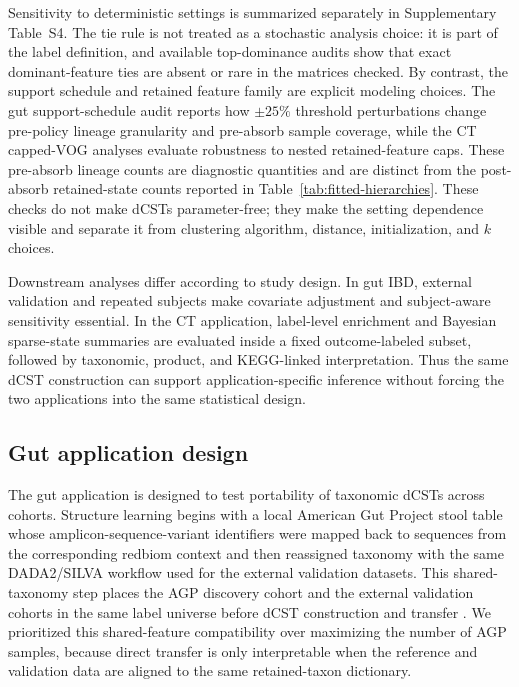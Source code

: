 \documentclass[11pt]{article}
\newcounter{algorithm}
\begin{document}
Sensitivity to deterministic settings is summarized separately in
Supplementary Table~S4. The tie rule is not treated as a stochastic analysis
choice: it is part of the label definition, and available top-dominance audits
show that exact dominant-feature ties are absent or rare in the matrices
checked. By contrast, the support schedule and retained feature family are
explicit modeling choices. The gut support-schedule audit reports how
\(\pm25\%\) threshold perturbations change pre-policy lineage granularity and
pre-absorb sample coverage, while the CT capped-VOG analyses evaluate robustness
to nested retained-feature caps. These pre-absorb lineage counts are diagnostic
quantities and are distinct from the post-absorb retained-state counts reported
in Table~\ref{tab:fitted-hierarchies}.
These checks do not make dCSTs parameter-free; they make the setting dependence
visible and separate it from clustering algorithm, distance, initialization, and
\(k\) choices.

Downstream analyses differ according to study design. In gut IBD, external
validation and repeated subjects make covariate adjustment and subject-aware
sensitivity essential. In the CT application, label-level enrichment and
Bayesian sparse-state summaries are evaluated inside a fixed outcome-labeled
subset, followed by taxonomic, product, and KEGG-linked interpretation. Thus the
same dCST construction can support application-specific inference without
forcing the two applications into the same statistical design.

\subsection{Gut application design}

The gut application is designed to test portability of taxonomic dCSTs across
cohorts. Structure learning begins with a local American Gut Project stool
table whose amplicon-sequence-variant identifiers were mapped back to sequences
from the corresponding redbiom context and then reassigned taxonomy with the
same DADA2/SILVA workflow used for the external validation datasets. This
shared-taxonomy step places the AGP
discovery cohort and the external validation cohorts in the same label universe
before dCST construction and transfer \cite{McDonald2018_AGP,Quast2013_SILVA}.
We prioritized this shared-feature compatibility over maximizing the number of
AGP samples, because direct transfer is only interpretable when the reference and
validation data are aligned to the same retained-taxon dictionary.
\end{document}
